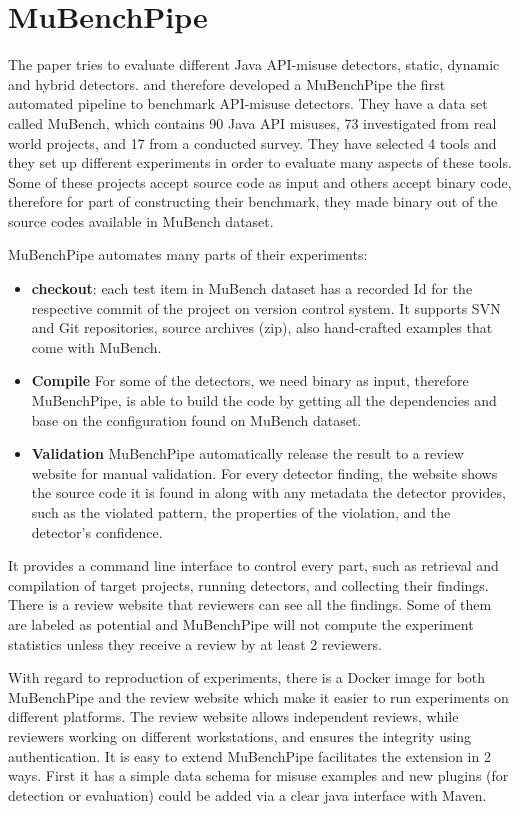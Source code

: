 \documentclass[authoryear,preprint]{sigplanconf}
\begin{document}
\section{MuBenchPipe}
\label{sec:sec_mubenchpipe}

The paper tries to evaluate different Java API-misuse detectors, static, dynamic and hybrid detectors. and therefore developed a MuBenchPipe \cite{8338426} the first automated pipeline to benchmark API-misuse detectors. They have a data set called MuBench, which contains 90 Java API misuses, 73 investigated from real world projects, and 17 from a conducted survey. They have selected 4 tools and they set up different experiments in order to evaluate many aspects of these tools. Some of these projects accept source code as input and others accept binary code, therefore for part of constructing their benchmark, they made binary out of the source codes available in MuBench dataset.

MuBenchPipe automates many parts of their experiments:
\begin{itemize}
	\item \textbf{checkout}: each test item in MuBench dataset has a recorded Id for the respective commit of the project on version control system. It supports SVN and Git repositories, source archives (zip), also hand-crafted examples that come with MuBench.
	\item \textbf{Compile} For some of the detectors, we need binary as input, therefore MuBenchPipe, is able to build the code by getting all the dependencies and base on the configuration found on MuBench dataset. 
	\item \textbf{Validation} MuBenchPipe automatically release the result to a review website for manual validation. For every detector finding, the website shows the source code it is found in along with any metadata the detector provides, such as the violated pattern, the properties of the violation, and the detector’s confidence\cite{8338426}.
\end{itemize}

It provides a command line interface to control every part, such as retrieval and compilation of target projects, running detectors, and collecting their findings. There is a review website that reviewers can see all the findings. Some of them are labeled as potential and MuBenchPipe will not compute the experiment statistics unless they receive a review by at least 2 reviewers. 

With regard to reproduction of experiments, there is a Docker image for both MuBenchPipe and the review website which make it easier to run experiments on different platforms. The review website allows independent reviews, while reviewers working on different workstations, and ensures the integrity using authentication. It is easy to extend MuBenchPipe facilitates the extension in 2 ways. First it has a simple data schema for misuse examples and new plugins (for detection or evaluation) could be added via a clear java interface with Maven. 
\end{document}
